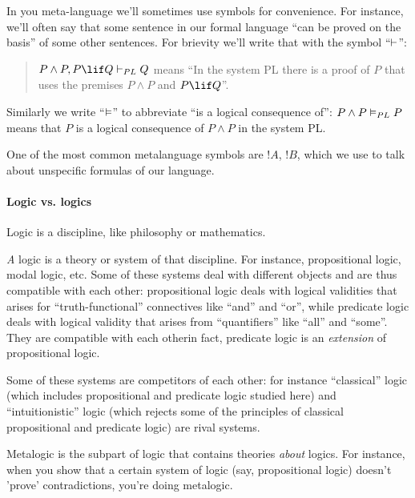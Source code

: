 \documentclass[../../../include/open-logic-part]{subfiles}
\begin{document}
In you meta-language we'll sometimes use symbols for convenience.
For instance, we'll often say that some sentence in our formal language
``can be proved on the basis'' of some other sentences. For brievity
we'll write that with the symbol ``$\Proves$'': 
\begin{quote}
$P\land P,P\lif Q\Proves[PL] Q$ means ``In the system PL there
is a proof of $P$ that uses the premises $P\land P$ and $P\lif Q$''.
\end{quote}
Similarly we write ``$\Entails$'' to abbreviate ``is a logical
consequence of'': $P\land P\Entails[PL]P$ means that $P$ is a logical
consequence of $P\land P$ in the system PL. 

One of the most common metalanguage symbols are $!A$, $!B$,
which we use to talk about unspecific formulas of our language. 

\paragraph{Logic vs. logics}

Logic is a discipline, like philosophy or mathematics. 

\emph{A }logic is a theory or system of that discipline. For instance,
propositional logic, modal logic, etc. Some of these systems deal
with different objects and are thus compatible with each other: propositional
logic deals with logical validities that arises for ``truth-functional''
connectives like ``and'' and ``or'', while predicate logic deals
with logical validity that arises from ``quantifiers'' like ``all''
and ``some''. They are compatible with each other\textemdash in
fact, predicate logic is an \emph{extension }of propositional logic. 

Some of these systems are competitors of each other: for instance
``classical'' logic (which includes propositional and predicate
logic studied here) and ``intuitionistic'' logic (which rejects
some of the principles of classical propositional and predicate logic)
are rival systems. 

Metalogic is the subpart of logic that contains theories \emph{about
}logics. For instance, when you show that a certain system of logic
(say, propositional logic) doesn't 'prove' contradictions, you're
doing metalogic. 


\OLEndChapterHook
\end{document}
